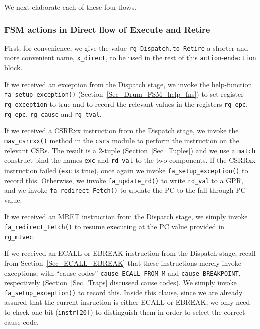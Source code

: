We next elaborate each of these four flows.


\subsubsection{FSM actions in Direct flow of Execute and Retire}


First, for convenience, we give the value \verb|rg_Dispatch.to_Retire|
a shorter and more convenient name, \verb|x_direct|, to be used in the
rest of this \verb|action|-\verb|endaction| block.

If we received an exception from the Dispatch stage, we invoke the
help-function \verb|fa_setup_exception()|
(Section~\ref{Sec_Drum_FSM_help_fns}) to set register
\verb|rg_exception| to true and to record the relevant values in the
registers \verb|rg_epc|, \verb|rg_epc|, \verb|rg_cause| and
\verb|rg_tval|.

If we received a CSRRxx instruction from the Dispatch stage, we invoke
the \verb|mav_csrrxx()| method in the \verb|csrs| module to perform
the instruction on the relevant CSRs.  The result is a 2-tuple
(Section~\ref{Sec_Tuples}) and we use a \verb|match| construct bind
the names \verb|exc| and \verb|rd_val| to the two components.  If the
CSRRxx instruction failed (\verb|exc| is true), once again we invoke
\verb|fa_setup_exception()| to record this.  Otherwise, we invoke
\verb|fa_update_rd()| to write \verb|rd_val| to a GPR, and we invoke
\verb|fa_redirect_Fetch()| to update the PC to the fall-through PC
value.

If we received an MRET instruction from the Dispatch stage, we simply
invoke \verb|fa_redirect_Fetch()| to resume executing at the PC value
provided in \verb|rg_mtvec|.

If we received an ECALL or EBREAK instruction from the Dispatch stage,
recall from Section~\ref{Sec_ECALL_EBREAK} that these instructions
merely invoke exceptions, with ``cause codes''
\verb|cause_ECALL_FROM_M| and \verb|cause_BREAKPOINT|, respectively
(Section~\ref{Sec_Traps} discussed cause codes).  We simply invoke
\verb|fa_setup_exception()| to record this.  Inside this clause, since
we are already assured that the current insruction is either ECALL or
EBREAK, we only need to check one bit (\verb|instr[20]|) to
distinguish them in order to select the correct cause code.

